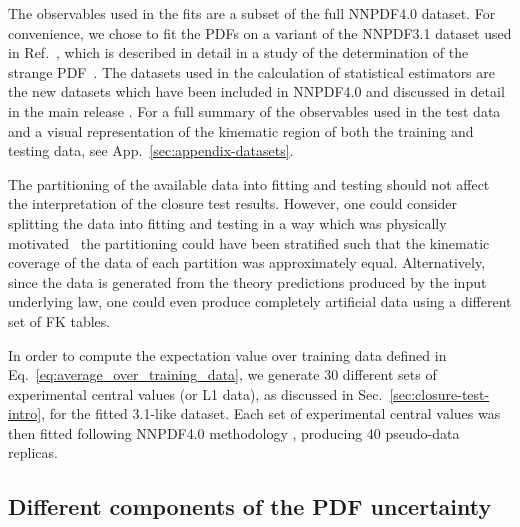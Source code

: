 The observables used in the fits are a subset of the full NNPDF4.0 dataset. For
convenience, we chose to fit the PDFs on a variant of the NNPDF3.1 dataset used
in Ref.~\cite{Ball_2018}, which is described in detail in a study of the
determination of the strange PDF~\cite{Faura_2020}. The datasets used in the
calculation of statistical estimators are the new datasets which have been
included in NNPDF4.0 and discussed in detail in the main release \cite{NNPDF40}. For a
full summary of the observables used in the test data and a visual representation of
the kinematic region of both the training and testing data, see
App.~\ref{sec:appendix-datasets}.

The partitioning of the available data into fitting and testing should not
affect the interpretation of the closure test results. However, one
could consider splitting the data into fitting and testing in a way which was
physically motivated \eg\ the partitioning could have been
stratified such that the kinematic coverage of the data of each partition
was approximately equal.
Alternatively, since the data is generated from the theory predictions produced
by the input underlying law, one could even produce completely artificial data
using a different set of FK tables. 

In order to compute the expectation value over training data defined in
Eq.~\ref{eq:average_over_training_data}, we generate 30 different sets of
experimental central values (or L1 data), as discussed in
Sec.~\ref{sec:closure-test-intro}, for the fitted 3.1-like dataset. Each set of
experimental central values was then fitted following NNPDF4.0 methodology
\cite{NNPDF40}, producing 40 pseudo-data replicas.


\subsection{Different components of the PDF uncertainty}

